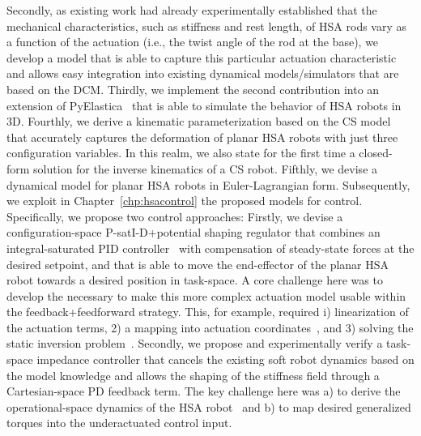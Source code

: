 Secondly, as existing work had already experimentally established that the mechanical characteristics, such as stiffness and rest length, of \gls{HSA} rods vary as a function of the actuation (i.e., the twist angle of the rod at the base), we develop a model that is able to capture this particular actuation characteristic and allows easy integration into existing dynamical models/simulators that are based on the \gls{DCM}.
Thirdly, we implement the second contribution into an extension of PyElastica~\cite{naughton2021elastica} that is able to simulate the behavior of \gls{HSA} robots in 3D.
Fourthly, we derive a kinematic parameterization based on the \gls{CS} model that accurately captures the deformation of planar \gls{HSA} robots with just three configuration variables. In this realm, we also state for the first time a closed-form solution for the inverse kinematics of a \gls{CS} robot.
Fifthly, we devise a dynamical model for planar \gls{HSA} robots in Euler-Lagrangian form.
Subsequently, we exploit in Chapter~\ref{chp:hsacontrol} the proposed models for control. Specifically, we propose two control approaches:
Firstly, we devise a configuration-space P-satI-D+potential shaping regulator that combines an integral-saturated PID controller~\cite{pustina2022p} with compensation of steady-state forces at the desired setpoint, and that is able to move the end-effector of the planar \gls{HSA} robot towards a desired position in task-space.
A core challenge here was to develop the necessary to make this more complex actuation model usable within the feedback+feedforward strategy. This, for example, required i) linearization of the actuation terms, 2) a mapping into actuation coordinates~\cite{pustina2024input}, and 3) solving the static inversion problem~\cite{della2025pushing}.
Secondly, we propose and experimentally verify a task-space impedance controller that cancels the existing soft robot dynamics based on the model knowledge and allows the shaping of the stiffness field through a Cartesian-space PD feedback term. The key challenge here was a) to derive the operational-space dynamics of the \gls{HSA} robot~\cite{khatib1987unified, della2020model} and b) to map desired generalized torques into the underactuated control input.


